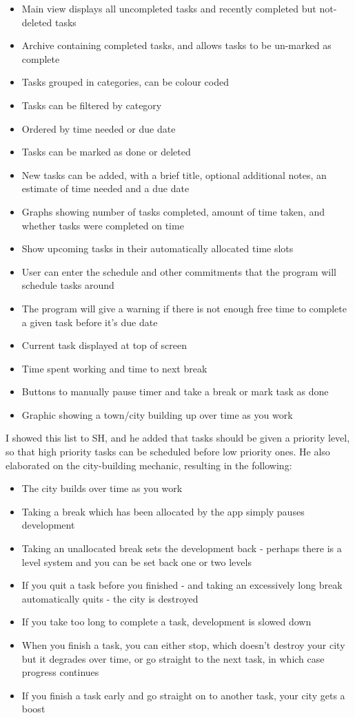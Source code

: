 \documentclass{article}
\begin{document}
\begin{itemize}
\item Main view displays all uncompleted tasks and recently completed but
  not-deleted tasks
\item Archive containing completed tasks, and allows tasks to be un-marked as
  complete
\item Tasks grouped in categories, can be colour coded
\item Tasks can be filtered by category
\item Ordered by time needed or due date
\item Tasks can be marked as done or deleted
\item New tasks can be added, with a brief title, optional additional notes, an
  estimate of time needed and a due date
\item Graphs showing number of tasks completed, amount of time taken, and
  whether tasks were completed on time
\item Show upcoming tasks in their automatically allocated time slots
\item User can enter the schedule and other commitments that the program will
  schedule tasks around
\item The program will give a warning if there is not enough free time to
  complete a given task before it's due date
\item Current task displayed at top of screen
\item Time spent working and time to next break
\item Buttons to manually pause timer and take a break or mark task as done
\item Graphic showing a town/city building up over time as you work
\end{itemize}

I showed this list to SH, and he added that tasks should be given a priority
level, so that high priority tasks can be scheduled before low priority ones. He
also elaborated on the city-building mechanic, resulting in the following:

\begin{itemize}
\item The city builds over time as you work
\item Taking a break which has been allocated by the app simply pauses
  development
\item Taking an unallocated break sets the development back - perhaps there is a
  level system and you can be set back one or two levels
\item If you quit a task before you finished - and taking an excessively long
  break automatically quits - the city is destroyed
\item If you take too long to complete a task, development is slowed down
\item When you finish a task, you can either stop, which doesn't destroy your
  city but it degrades over time, or go straight to the next task, in which case
  progress continues
\item If you finish a task early and go straight on to another task, your city
  gets a boost
\end{itemize}
\end{document}
